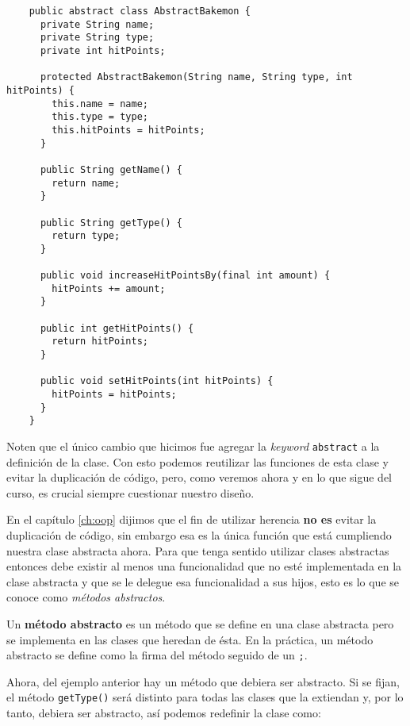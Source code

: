   \begin{verbatim}
    public abstract class AbstractBakemon {
      private String name;
      private String type;
      private int hitPoints;

      protected AbstractBakemon(String name, String type, int hitPoints) {
        this.name = name;
        this.type = type;
        this.hitPoints = hitPoints;
      }

      public String getName() {
        return name;
      }

      public String getType() {
        return type;
      }

      public void increaseHitPointsBy(final int amount) {
        hitPoints += amount;
      }

      public int getHitPoints() {
        return hitPoints;
      }

      public void setHitPoints(int hitPoints) {
        hitPoints = hitPoints;
      }
    }
  \end{verbatim}

  Noten que el único cambio que hicimos fue agregar la \textit{keyword} \texttt{abstract}
  a la definición de la clase.
  Con esto podemos reutilizar las funciones de esta clase y evitar la duplicación de código, pero,
  como veremos ahora y en lo que sigue del curso, es crucial siempre cuestionar nuestro diseño.

  En el capítulo \ref{ch:oop} dijimos que el fin de utilizar herencia \textbf{no es} evitar la 
  duplicación de código, sin embargo esa es la única función que está cumpliendo nuestra clase 
  abstracta ahora.
  Para que tenga sentido utilizar clases abstractas entonces debe existir al menos una funcionalidad
  que no esté implementada en la clase abstracta y que se le delegue esa funcionalidad a sus hijos,
  esto es lo que se conoce como \textit{métodos abstractos}.

  Un \textbf{método abstracto} es un método que se define en una clase abstracta pero se implementa
  en las clases que heredan de ésta.
  En la práctica, un método abstracto se define como la firma del método seguido de un \texttt{;}.

  Ahora, del ejemplo anterior hay un método que debiera ser abstracto.
  Si se fijan, el método \texttt{getType()} será distinto para todas las clases que la extiendan y,
  por lo tanto, debiera ser abstracto, así podemos redefinir la clase como:
  
